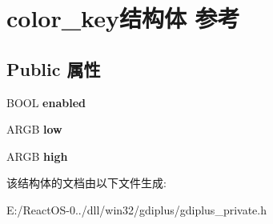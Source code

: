 \hypertarget{structcolor__key}{}\section{color\+\_\+key结构体 参考}
\label{structcolor__key}
\subsection*{Public 属性}
\begin{DoxyCompactItemize}
\item 
\mbox{\label{structcolor__key_a18b22f973507b89f4437c2181274da6f}} 
B\+O\+OL {\bfseries enabled}
\item 
\mbox{\label{structcolor__key_ac7af37645bd283513105236b6a509b7e}} 
A\+R\+GB {\bfseries low}
\item 
\mbox{\label{structcolor__key_aa86b0b2f132bba8e92071a28ddc60e43}} 
A\+R\+GB {\bfseries high}
\end{DoxyCompactItemize}


该结构体的文档由以下文件生成\+:\begin{DoxyCompactItemize}
\item 
E\+:/\+React\+O\+S-\/0../dll/win32/gdiplus/gdiplus\+\_\+private.\+h\end{DoxyCompactItemize}
